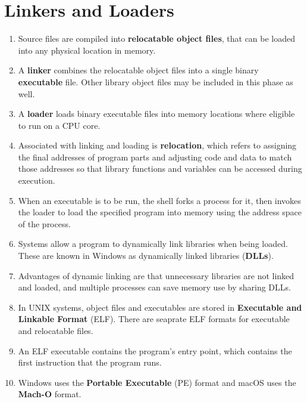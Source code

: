 \documentclass[journal,12pt,twocolumn]{IEEEtran}
\begin{document}
\section{Linkers and Loaders}
\begin{enumerate}
    \item Source files are compiled into \textbf{relocatable object files}, that 
    can be loaded into any physical location in memory.
    \item A \textbf{linker} combines the relocatable object files into a single
    binary \textbf{executable} file. Other library object files may be included
    in this phase as well.
    \item A \textbf{loader} loads binary executable files into memory 
    locations where eligible to run on a CPU core.
    \item Associated with linking and loading is \textbf{relocation}, which 
    refers to assigning the final addresses of program parts and adjusting code
    and data to match those addresses so that library functions and variables 
    can be accessed during execution.
    \item When an executable is to be run, the shell forks a process for it, 
    then invokes the loader to load the specified program into memory using the 
    address space of the process.
    \item Systems allow a program to dynamically link libraries when being 
    loaded. These are known in Windows as dynamically linked libraries 
    (\textbf{DLLs}).
    \item Advantages of dynamic linking are that unnecessary libraries are not 
    linked and loaded, and multiple processes can save memory use by sharing DLLs.
    \item In UNIX systems, object files and executables are stored in
    \textbf{Executable and Linkable Format} (ELF). There are seaprate ELF formats 
    for executable and relocatable files.
    \item An ELF executable contains the program's entry point, which contains 
    the first instruction that the program runs.
    \item Windows uses the \textbf{Portable Executable} (PE) format and macOS 
    uses the \textbf{Mach-O} format.   
\end{enumerate}
\end{document}
